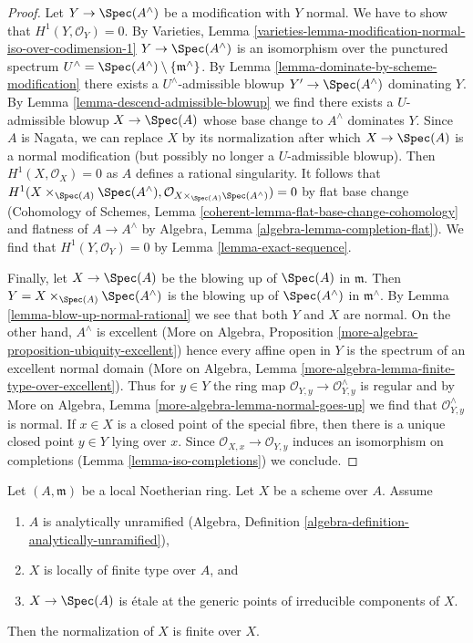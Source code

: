 \begin{proof}
Let $Y \to \Spec(A^\wedge)$ be a modification with $Y$ normal.
We have to show that $H^1(Y, \mathcal{O}_Y) = 0$. By Varieties, Lemma
\ref{varieties-lemma-modification-normal-iso-over-codimension-1}
$Y \to \Spec(A^\wedge)$ is an isomorphism over the punctured
spectrum $U^\wedge = \Spec(A^\wedge) \setminus \{\mathfrak m^\wedge\}$.
By Lemma \ref{lemma-dominate-by-scheme-modification}
there exists a $U^\wedge$-admissible blowup $Y' \to \Spec(A^\wedge)$
dominating $Y$. By Lemma \ref{lemma-descend-admissible-blowup}
we find there exists a $U$-admissible blowup $X \to \Spec(A)$
whose base change to $A^\wedge$ dominates $Y$.
Since $A$ is Nagata, we can replace $X$ by its normalization
after which $X \to \Spec(A)$ is a normal modification (but
possibly no longer a $U$-admissible blowup).
Then $H^1(X, \mathcal{O}_X) = 0$ as $A$ defines a rational
singularity. It follows that
$H^1(X \times_{\Spec(A)} \Spec(A^\wedge),
\mathcal{O}_{X \times_{\Spec(A)} \Spec(A^\wedge)}) = 0$
by flat base change (Cohomology of Schemes, Lemma
\ref{coherent-lemma-flat-base-change-cohomology}
and flatness of $A \to A^\wedge$ by
Algebra, Lemma \ref{algebra-lemma-completion-flat}).
We find that $H^1(Y, \mathcal{O}_Y) = 0$ by
Lemma \ref{lemma-exact-sequence}.

\medskip\noindent
Finally, let $X \to \Spec(A)$ be the blowing up of $\Spec(A)$
in $\mathfrak m$. Then $Y = X \times_{\Spec(A)} \Spec(A^\wedge)$
is the blowing up of $\Spec(A^\wedge)$ in $\mathfrak m^\wedge$.
By Lemma \ref{lemma-blow-up-normal-rational} we see that both $Y$
and $X$ are normal. On the other hand, $A^\wedge$ is excellent
(More on Algebra, Proposition
\ref{more-algebra-proposition-ubiquity-excellent})
hence every affine open in $Y$ is the spectrum of an
excellent normal domain
(More on Algebra, Lemma \ref{more-algebra-lemma-finite-type-over-excellent}).
Thus for $y \in Y$ the ring map
$\mathcal{O}_{Y, y} \to \mathcal{O}_{Y, y}^\wedge$
is regular and by
More on Algebra, Lemma \ref{more-algebra-lemma-normal-goes-up}
we find that $\mathcal{O}_{Y, y}^\wedge$ is normal.
If $x \in X$ is a closed point of the special fibre,
then there is a unique closed point $y \in Y$ lying over $x$.
Since $\mathcal{O}_{X, x} \to \mathcal{O}_{Y, y}$ induces
an isomorphism on completions (Lemma \ref{lemma-iso-completions})
we conclude.
\end{proof}

\begin{lemma}
\label{lemma-formally-unramified}
Let $(A, \mathfrak m)$ be a local Noetherian ring. Let
$X$ be a scheme over $A$. Assume
\begin{enumerate}
\item $A$ is analytically unramified
(Algebra, Definition \ref{algebra-definition-analytically-unramified}),
\item $X$ is locally of finite type over $A$, and
\item $X \to \Spec(A)$ is \'etale at the generic points of irreducible
components of $X$.
\end{enumerate}
Then the normalization of $X$ is finite over $X$.
\end{lemma}

